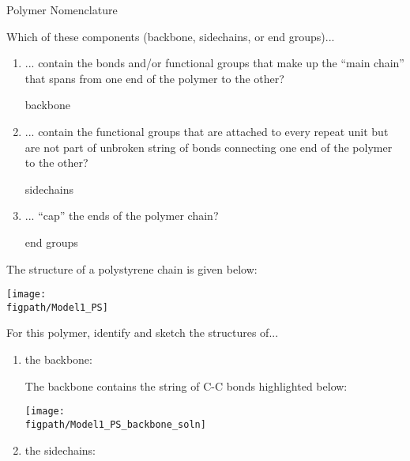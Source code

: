 \begin{activity}{Polymer Nomenclature}
\begin{model}
\end{model}


\begin{ctqs}

	\question Which of these components (backbone, sidechains, or end groups)...
	
		\begin{enumerate}
			\item ... contain the bonds and/or functional groups that make up the ``main chain'' that spans from one end of the polymer to the other?
			
				\begin{solution}[0.25in]{}
					backbone
				\end{solution}
			
			\item ... contain the functional groups that are attached to every repeat unit but are not part of unbroken string of bonds connecting one end of the polymer to the other?
			
				\begin{solution}[0.25in]{}
					sidechains
				\end{solution}
			
			\item ... ``cap'' the ends of the polymer chain?
			
				\begin{solution}[0.25in]{}
					end groups
				\end{solution}
				
		\end{enumerate}
		
	\question The structure of a polystyrene chain is given below:
	
		\vspace{6pt}
		\centerline{\texttt{[image: \\figpath/Model1\_PS]}}
	
		For this polymer, identify and sketch the structures of...
		\begin{enumerate}
			\item the backbone:
			
				\begin{solution}[1in]{}
					The backbone contains the string of C-C bonds highlighted below:
					
					\centerline{\texttt{[image: \\figpath/Model1\_PS\_backbone\_soln]}}
				\end{solution}
			
			\item the sidechains:
			

\end{enumerate}
\end{ctqs}
\end{activity}
